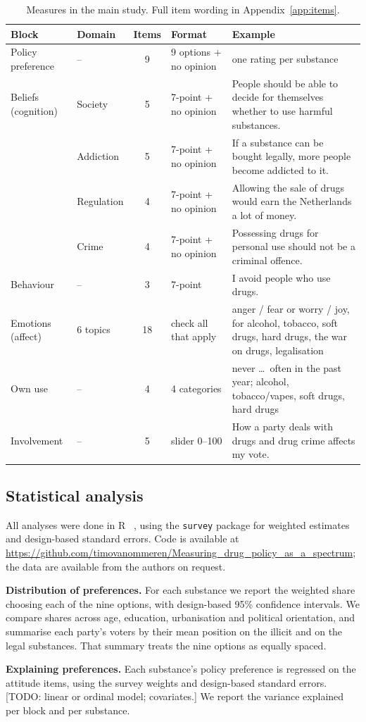 \begin{table}[htbp]
\centering
\small
\caption{Measures in the main study. Full item wording in Appendix~\ref{app:items}.}
\label{tab:measures}
\begin{tabularx}{\linewidth}{@{}l l c l X@{}}
\toprule
Block & Domain & Items & Format & Example \\
\midrule
Policy preference & -- & 9 & 9 options + no opinion & one rating per substance \\
\addlinespace
Beliefs (cognition) & Society & 5 & 7-point + no opinion & People should be able to decide for themselves whether to use harmful substances. \\
 & Addiction & 5 & 7-point + no opinion & If a substance can be bought legally, more people become addicted to it. \\
 & Regulation & 4 & 7-point + no opinion & Allowing the sale of drugs would earn the Netherlands a lot of money. \\
 & Crime & 4 & 7-point + no opinion & Possessing drugs for personal use should not be a criminal offence. \\
\addlinespace
Behaviour & -- & 3 & 7-point & I avoid people who use drugs. \\
\addlinespace
Emotions (affect) & 6 topics & 18 & check all that apply & anger / fear or worry / joy, for alcohol, tobacco, soft drugs, hard drugs, the war on drugs, legalisation \\
\addlinespace
Own use & -- & 4 & 4 categories & never \ldots\ often in the past year; alcohol, tobacco/vapes, soft drugs, hard drugs \\
\addlinespace
Involvement & -- & 5 & slider 0--100 & How a party deals with drugs and drug crime affects my vote. \\
\bottomrule
\end{tabularx}
\end{table}

\subsection{Statistical analysis}

All analyses were done in R \rVersion\ \parencite{rcore}, using the \texttt{survey} package
\parencite{lumley2004} for weighted estimates and design-based standard errors. Code is available at
\url{https://github.com/timovanommeren/Measuring_drug_policy_as_a_spectrum}; the data are available
from the authors on request.

\textbf{Distribution of preferences.} For each substance we report the weighted share choosing each of
the nine options, with design-based 95\% confidence intervals. We compare shares across age,
education, urbanisation and political orientation, and summarise each party's voters by their mean
position on the illicit and on the legal substances. That summary treats the nine options as equally
spaced.

\textbf{Explaining preferences.} Each substance's policy preference is regressed on the attitude
items, using the survey weights and design-based standard errors. [TODO: linear or ordinal model;
covariates.] We report the variance explained per block and per substance.
